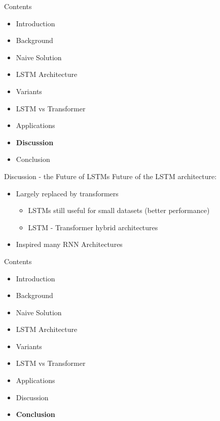 \documentclass[10pt, aspectratio=169]{beamer}
\begin{document}
\begin{frame}[t]{Contents}
\begin{itemize}
    \item Introduction
    \item Background
    \item Naive Solution
    \item LSTM Architecture
    \item Variants
    \item LSTM vs Transformer
    \item Applications
    \item \textbf{Discussion}
    \item Conclusion
\end{itemize}
\end{frame}

\begin{frame}[t]{Discussion - the Future of LSTMs}
Future of the LSTM architecture: \pause
\begin{itemize}
    \item Largely replaced by transformers \pause
    \begin{itemize}
        \item LSTMs still useful for small datasets (better performance) \pause
        \item LSTM - Transformer hybrid architectures \pause
    \end{itemize} 
    \item Inspired many RNN Architectures \pause
\end{itemize}
\end{frame}

\begin{frame}[t]{Contents}
\begin{itemize}
    \item Introduction
    \item Background
    \item Naive Solution
    \item LSTM Architecture
    \item Variants
    \item LSTM vs Transformer
    \item Applications
    \item Discussion
    \item \textbf{Conclusion}
\end{itemize}
\end{frame}
\end{document}
